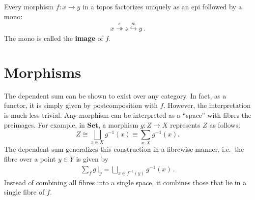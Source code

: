     \begin{property}
        Every morphism $f:x\rightarrow y$ in a topos factorizes uniquely as an epi followed by a mono:
        \begin{gather}
            x\overset{e}{\twoheadrightarrow}z\overset{m}{\hookrightarrow}y\,.
        \end{gather}
        The mono is called the \textbf{image} of $f$.
    \end{property}

\section{Morphisms}

    \begin{remark}
        The dependent sum can be shown to exist over any category. In fact, as a functor, it is simply given by postcomposition with $f$. However, the interpretation is much less trivial. Any morphism can be interpreted as a ``space'' with fibres the preimages. For example, in $\mathbf{Set}$, a morphism $g:Z\rightarrow X$ represents $Z$ as follows: \[Z\cong\bigsqcup_{x\in X}g^{-1}(x)\equiv\sum_{x:X}g^{-1}(x).\] The dependent sum generalizes this construction in a fibrewise manner, i.e.~the fibre over a point $y\in Y$ is given by
        \begin{gather}
            \sum_fg\,\Big|_y = \bigsqcup_{x\in f^{-1}(y)}g^{-1}(x)\,.
        \end{gather}
        Instead of combining all fibres into a single space, it combines those that lie in a single fibre of $f$.
    \end{remark}

